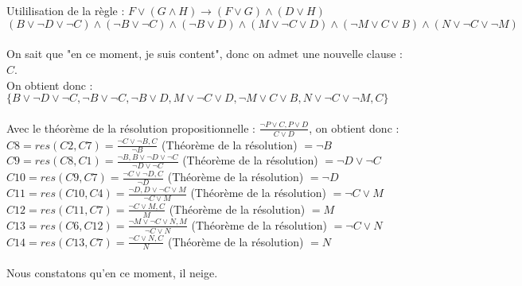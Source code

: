 \documentclass{article}
\begin{document}
\\
\\
Utililisation de la règle : $F \lor (G \land H) \rightarrow (F \lor G) \land (D \lor H) $
\newline
\\
$(B \lor \neg D \lor \neg C) \land (\neg B \lor \neg C) \land (\neg B \lor D) \land (M \lor \neg C \lor D) \land (\neg M \lor C \lor B) \land (N \lor \neg C \lor \neg M)$
\newline
\\
\\
On sait que "en ce moment, je suis content", donc on admet une nouvelle clause : $C$.
\newline
\\
On obtient donc : $\{B \lor \neg D \lor \neg C, \neg B \lor \neg C, \neg B \lor D, M \lor \neg C \lor D, \neg M \lor C \lor B, N \lor \neg C \lor \neg M, C\}$
\newline
\\
\\
Avec le théorème de la résolution propositionnelle : $\frac{\neg P \lor C, P \lor D}{C \lor D}$, on obtient donc :
\newline
\\
$C8 = res(C2, C7) = \frac{\neg C \lor \neg B, C}{\neg B}$ (Théorème de la résolution) $ = \neg B$ 
\newline
\\
$C9 = res(C8,C1) = \frac{\neg B, B \lor \neg D \lor \neg C}{\neg D \lor \neg C}$ (Théorème de la résolution) $ = \neg D \lor \neg C$ 
\newline
\\
$C10 = res(C9, C7) = \frac{\neg C \lor \neg D, C}{\neg D}$ (Théorème de la résolution) $ = \neg D$ 
\newline
\\
$C11 = res(C10, C4) = \frac{\neg D, D \lor \neg C \lor M}{\neg C \lor M}$ (Théorème de la résolution) $ = \neg C \lor M$
\newline
\\
$C12 = res(C11, C7) = \frac{\neg C \lor M, C}{M}$ (Théorème de la résolution) $ = M$ 
\newline
\\
$C13 = res(C6, C12) = \frac{\neg M \lor \neg C \lor N, M}{\neg C \lor N}$ (Théorème de la résolution) $ = \neg C \lor N$
\newline
\\
$C14 = res(C13, C7) = \frac{\neg C \lor N, C}{N}$ (Théorème de la résolution) $ = N$
\newline
\\
\\
Nous constatons qu'en ce moment, il neige. 
\end{document}
